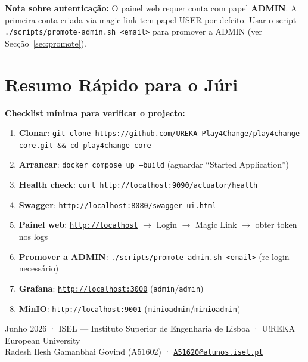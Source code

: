 \documentclass[12pt,a4paper]{article}
\newcommand{\cmd}[1]{\texttt{\small\color{accent}#1}}
\begin{document}
\begin{mdframed}[style=warningbox]
\textbf{Nota sobre autenticação:} O painel web requer conta com papel \textbf{ADMIN}. A primeira conta criada via magic link tem papel USER por defeito. Usar o script \cmd{./scripts/promote-admin.sh \textless{}email\textgreater{}} para promover a ADMIN (ver Secção~\ref{sec:promote}).
\end{mdframed}

\section{Resumo Rápido para o Júri}

\begin{mdframed}[style=successbox]
\textbf{Checklist mínima para verificar o projecto:}

\begin{enumerate}
  \item \textbf{Clonar}: \cmd{git clone https://github.com/UREKA-Play4Change/play4change-core.git \&\& cd play4change-core}
  \item \textbf{Arrancar}: \cmd{docker compose up --build} \quad (aguardar ``Started Application'')
  \item \textbf{Health check}: \cmd{curl http://localhost:9090/actuator/health}
  \item \textbf{Swagger}: \href{http://localhost:8080/swagger-ui.html}{\texttt{http://localhost:8080/swagger-ui.html}}
  \item \textbf{Painel web}: \href{http://localhost}{\texttt{http://localhost}} $\to$ Login $\to$ Magic Link $\to$ obter token nos logs
  \item \textbf{Promover a ADMIN}: \cmd{./scripts/promote-admin.sh \textless{}email\textgreater{}} \quad (re-login necessário)
  \item \textbf{Grafana}: \href{http://localhost:3000}{\texttt{http://localhost:3000}} \quad (\texttt{admin}/\texttt{admin})
  \item \textbf{MinIO}: \href{http://localhost:9001}{\texttt{http://localhost:9001}} \quad (\texttt{minioadmin}/\texttt{minioadmin})
\end{enumerate}
\end{mdframed}

\vspace{1em}

\begin{center}
\small\color{gray}
Junho 2026 · ISEL — Instituto Superior de Engenharia de Lisboa · U!REKA European University\\
Radesh Ilesh Gamanbhai Govind (A51602) · \href{mailto:A51620@alunos.isel.pt}{\texttt{A51620@alunos.isel.pt}}
\end{center}
\end{document}
